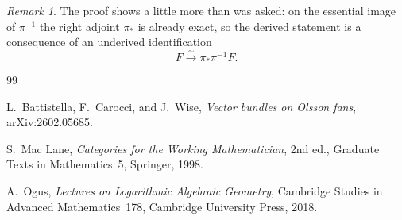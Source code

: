 \documentclass[11pt]{article}
\theoremstyle{remark}
\newtheorem{remark}[theorem]{Remark}
\begin{document}
\begin{remark}
The proof shows a little more than was asked: on the essential image of $\pi^{-1}$ the
right adjoint $\pi_*$ is already exact, so the derived statement is a consequence of an
underived identification
\[
F \xrightarrow{\sim} \pi_*\pi^{-1}F.
\]
\end{remark}

\begin{thebibliography}{99}

L.~Battistella, F.~Carocci, and J.~Wise,
\emph{Vector bundles on Olsson fans},
arXiv:2602.05685.

S.~Mac Lane,
\emph{Categories for the Working Mathematician},
2nd ed., Graduate Texts in Mathematics~5, Springer, 1998.

A.~Ogus,
\emph{Lectures on Logarithmic Algebraic Geometry},
Cambridge Studies in Advanced Mathematics~178, Cambridge University Press, 2018.

\end{thebibliography}
\end{document}
